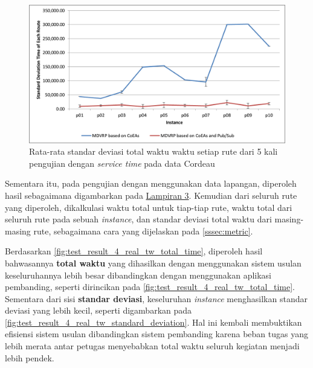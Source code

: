\begin{figure}[!]
	\centering
	\includegraphics[width=\textwidth]{Resources/Images/test_result_10_cordeau_tw_standard_deviation}
	\caption{Rata-rata standar deviasi total waktu waktu setiap rute dari 5 kali pengujian dengan \textit{service time} pada data Cordeau}
	\label{fig:test_result_10_cordeau_tw_standard_deviation}
\end{figure}


Sementara itu, pada pengujian dengan menggunakan data lapangan, diperoleh hasil sebagaimana digambarkan pada \hyperref[ch:test_result_real_tw]{Lampiran 3}. Kemudian dari seluruh rute yang diperoleh, dikalkulasi waktu total untuk tiap-tiap rute, waktu total dari seluruh rute pada sebuah \textit{instance}, dan standar deviasi total waktu dari masing-masing rute, sebagaimana cara yang dijelaskan pada \autoref{sssec:metric}. 


Berdasarkan \autoref{fig:test_result_4_real_tw_total_time}, diperoleh hasil bahwasannya \textbf{total waktu} yang dihasilkan dengan menggunakan sistem usulan keseluruhannya lebih besar dibandingkan dengan menggunakan aplikasi pembanding, seperti dirincikan pada \autoref{fig:test_result_4_real_tw_total_time}. Sementara dari sisi \textbf{standar deviasi}, keseluruhan \textit{instance} menghasilkan standar deviasi yang lebih kecil, seperti digambarkan pada \autoref{fig:test_result_4_real_tw_standard_deviation}. Hal ini kembali membuktikan efisiensi sistem usulan dibandingkan sistem pembanding karena beban tugas yang lebih merata antar petugas menyebabkan total waktu seluruh kegiatan menjadi lebih pendek.


